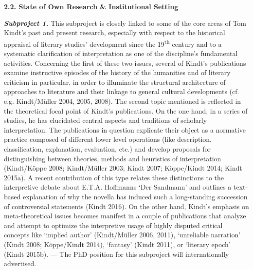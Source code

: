 
\vspace{.2cm}
\noindent\textbf{\large 2.2. State of Own Research \& Institutional Setting}
\vspace{.2cm}

\noindent \textbf{\emph{Subproject 1.}} This subproject is closely linked to some of the core areas of Tom Kindt's past and present research, especially with respect to the historical appraisal of literary studies' development since the 19\textsuperscript{th} century and to a systematic clarification of interpretation as one of the discipline's fundamental activities. Concerning the first of these two issues, several of Kindt's publications examine instructive episodes of the history of the humanities and of literary criticism in particular, in order to illuminate the structural architecture of approaches to literature and their linkage to general cultural developments (cf. e.g. Kindt/M\"uller 2004, 2005, 2008). The second topic mentioned is reflected in the theoretical focal point of Kindt's publications. On the one hand, in a series of studies, he has elucidated central aspects and traditions of scholarly interpretation. The publications in question explicate their object as a normative practice composed of different lower level operations (like description, classification, explanation, evaluation, etc.) and develop proposals for distinguishing between theories, methods and heuristics of interpretation (Kindt/K\"oppe 2008; Kindt/M\"uller 2003; Kindt 2007; K\"oppe/Kindt 2014; Kindt 2015a). A recent contribution of this type relates these distinctions to the interpretive debate about E.T.A. Hoffmanns `Der Sandmann' and outlines a text-based explanation of why the novella has induced such a long-standing succession of controversial statements (Kindt 2016). On the other hand, Kindt's emphasis on meta-theoretical issues becomes manifest in a couple of publications that analyze and attempt to optimize the interpretive usage of highly disputed critical concepts like `implied author' (Kindt/M\"uller 2006, 2011), `unreliable narration' (Kindt 2008; K\"oppe/Kindt 2014), `fantasy' (Kindt 2011), or `literary epoch' (Kindt 2015b). --- The PhD position for this subproject will internationally advertised.


